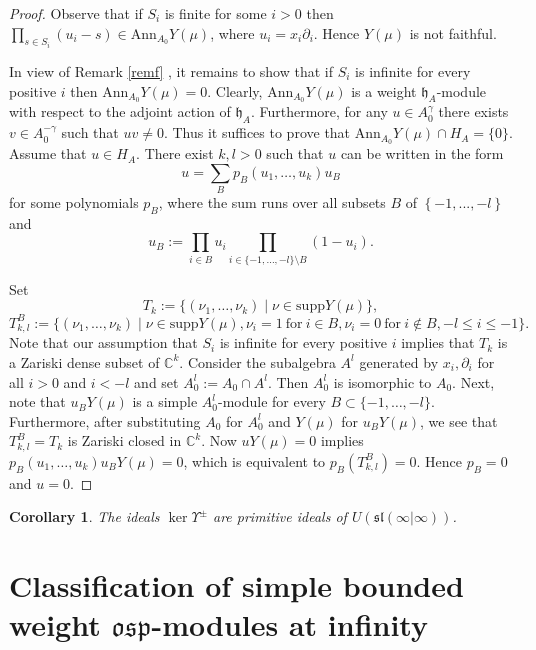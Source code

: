\documentclass[12pt]{amsart}
\makeatletter
\def\@putname#1#2#3#4{\def\@@ref{#3}\let\old@bf\bf
        \def\bf##1{\old@bf\if?\noexpand##1?{#4}\else##1\fi}%
	#1{#2}%
        \let\bf\old@bf}
\def\@putname#1#2#3#4{\def\@@ref{#3}\let\old@bf\bf	%
	\let\old@reset@font\reset@font			%
        \def\bf##1{\old@bf\if?\noexpand##1?{#4}\else##1\fi}%
	\def\reset@font##1##2{\old@reset@font##1\if?\noexpand##2?{#4}\else##2\fi}#1{#2}%
        \let\bf\old@bf\let\reset@font\old@reset@font}
\let\my@ref=\ref
\def\ref#1{\@putname\my@ref{#1}{#1}{\tiny\rm\@@ref}}
\theoremstyle{plain} %
\numberwithin{equation}{section}
\theoremstyle{definition}
\theoremstyle{remark}
\theoremstyle{plain} %
\newtheorem{corollary}[definition]{Corollary}
\newcommand{\osp}{\mathfrak{osp}}
\newcommand{\Ann}{\mathrm{Ann}}
\newcommand{\supp}{\mathrm{supp}}
\newcommand{\gh}{\mathfrak{h}}
\def\gh{\mathfrak{h}}
\makeatother
\begin{document}
    \begin{proof} Observe that if $S_i$ is finite for some $i>0$ then $\prod_{s\in S_i}(u_i-s)\in\Ann_{A_0}Y(\mu)$, where $u_i=x_i\partial_i$.
        Hence $Y(\mu)$ is not faithful.


                  


          In view of Remark \ref{remf}, it remains to show that if $S_i$ is infinite for every positive $i$ then $\Ann_{A_0}Y(\mu)=0$.  Clearly, $\Ann_{A_0}Y(\mu)$ is a weight $\gh_A$-module with respect to the adjoint action of $\gh_A$. Furthermore, for any
          $u\in A_0^{\gamma}$ there exists $v\in A_0^{-\gamma}$ such that $uv\neq 0$. Thus it suffices to prove that $\Ann_{A_0}Y(\mu)\cap H_A=\{0\}$.
          Assume that $u\in H_A$. There exist $k,l>0$ such that $u$ can be written in the form
          $$u=\sum_{B} p_B(u_1,\dots,u_k) u_{B}$$          
          for some  polynomials $p_B$, where the sum runs over all subsets $B$ of
          $\left\{ -1,...,-l \right\}$ and
          $$u_B:=\prod_{i\in B}u_i\prod_{i\in\{-1,\dots,-l\}\setminus B}(1-u_i).$$ 
          
          Set 
        $$T_{k}:=\{(\nu_1,\dots,\nu_k)\mid\nu\in\supp Y(\mu)\},$$
        $$T_{k,l}^B:=\{(\nu_1,\dots,\nu_k)\mid\nu\in\supp Y(\mu), \nu_{i}=1\ \text{for}\ i\in B, \nu_i=0\ \text{for}\ i\notin B, -l\leq i\leq -1 \}.$$
Note that our assumption that $S_i$ is infinite for every positive $i$ implies that $T_k$ is a Zariski dense subset of $\mathbb C^k$. Consider the subalgebra $A^l$ generated by $x_i,\partial_i$ for all
        $i>0$ and $i<-l$ and set $A_0^l:=A_0\cap A^l$. Then $A^l_0$ is isomorphic to $A_0$. Next, note that  $u_BY(\mu)$ is a simple $A_0^l$-module for every $B\subset\{-1,\dots,-l\}$. Furthermore, after substituting $A_0$ for $A^l_0$ and $Y(\mu)$ for $u_BY(\mu)$, we see that
        $T_{k,l}^B=T_k$ is Zariski closed in $\mathbb C^k$. Now $uY(\mu)=0$ implies $p_B(u_1,\dots,u_k)u_BY(\mu)=0$, which is equivalent to
        $p_B(T_{k,l}^B)=0$. Hence $p_B=0$ and $u=0$. \end{proof}
          
          
   
      \begin{corollary}\label{primcor} The ideals $\ker\Upsilon^\pm$ are primitive ideals of $U(\mathfrak{sl}(\infty|\infty))$.
          \end{corollary}
          

\section{Classification of simple bounded weight $\osp$-modules at infinity}
\end{document}
